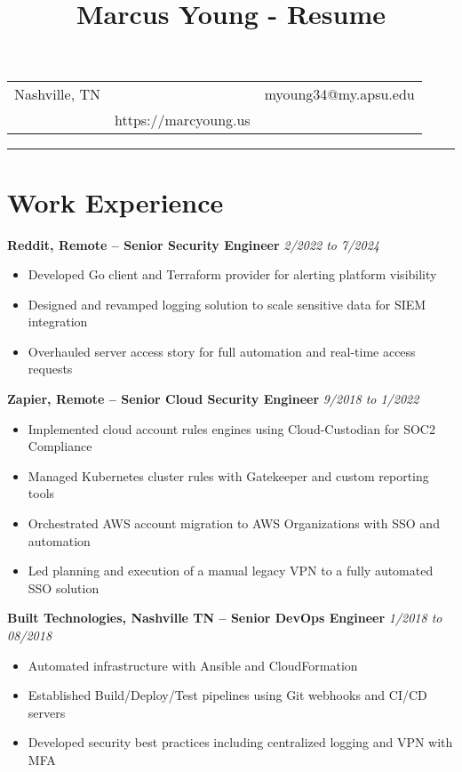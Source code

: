 \documentclass[a4paper,10pt]{article}
\title{Marcus Young - Resume}
\author{}
\date{}
\begin{document}
\maketitle

\begin{center}
    \begin{tabular}{l c r}
        Nashville, TN & & myoung34@my.apsu.edu \\
        & {https://marcyoung.us} & \\
    \end{tabular}
    \hrule height 1pt %
\end{center}

\vspace{4pt}

\section*{Work Experience}

\textbf{Reddit, Remote – Senior Security Engineer} \hfill \textit{2/2022 to 7/2024}
\begin{itemize}
    \item Developed Go client and Terraform provider for alerting platform visibility
    \item Designed and revamped logging solution to scale sensitive data for SIEM integration
    \item Overhauled server access story for full automation and real-time access requests
\end{itemize}

\textbf{Zapier, Remote – Senior Cloud Security Engineer} \hfill \textit{9/2018 to 1/2022}
\begin{itemize}
    \item Implemented cloud account rules engines using Cloud-Custodian for SOC2 Compliance
    \item Managed Kubernetes cluster rules with Gatekeeper and custom reporting tools
    \item Orchestrated AWS account migration to AWS Organizations with SSO and automation
    \item Led planning and execution of a manual legacy VPN to a fully automated SSO solution
\end{itemize}

\textbf{Built Technologies, Nashville TN – Senior DevOps Engineer} \hfill \textit{1/2018 to 08/2018}
\begin{itemize}
    \item Automated infrastructure with Ansible and CloudFormation
    \item Established Build/Deploy/Test pipelines using Git webhooks and CI/CD servers
    \item Developed security best practices including centralized logging and VPN with MFA
\end{itemize}
\end{document}
